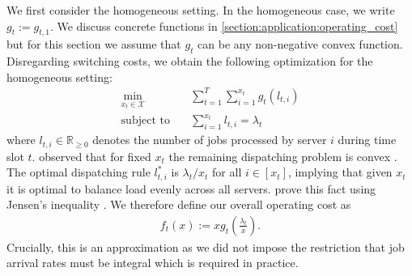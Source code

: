 We first consider the homogeneous setting. In the homogeneous case, we write $g_t := g_{t,1}$. We discuss concrete functions in \autoref{section:application:operating_cost} but for this section we assume that $g_t$ can be any non-negative convex function. Disregarding switching costs, we obtain the following optimization for the homogeneous setting: \begin{align*}
    \min_{x_t \in \mathcal{X}} \quad &\sum_{t=1}^T \sum_{i=1}^{x_t} g_t(l_{t,i}) \\
    \text{subject to}        \quad &\sum_{i=1}^{x_t} l_{t,i} = \lambda_t
\end{align*} where $l_{t,i} \in \mathbb{R}_{\geq 0}$ denotes the number of jobs processed by server $i$ during time slot $t$. \citeauthor*{Lin2011} observed that for fixed $x_t$ the remaining dispatching problem is convex \cite{Lin2011}. The optimal dispatching rule $l_{t,i}^*$ is $\lambda_t / x_t$ for all $i \in [x_t]$, implying that given $x_t$ it is optimal to balance load evenly across all servers. \citeauthor*{Albers2021_2} prove this fact using Jensen's inequality \cite{Albers2021_2}. We therefore define our overall operating cost as \begin{align}\label{eq:homogeneous_load_balancing}
    f_t(x) := x g_t\left(\frac{\lambda_t}{x}\right).
\end{align} Crucially, this is an approximation as we did not impose the restriction that job arrival rates must be integral which is required in practice.

